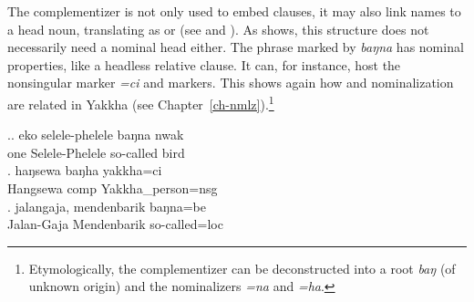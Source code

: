 The complementizer is not only used to embed clauses, it may also link names to a head noun, translating as  or  (see \Next[a] and \Next[b]). As  \Next[c] shows, this structure does not necessarily need a nominal head either. The phrase marked by \emph{baŋna} has nominal properties, like a headless relative clause. It can, for instance, host the nonsingular marker \emph{=ci} and  markers. This shows again how  and nominalization are related in Yakkha (see Chapter~\ref{ch-nmlz}).\footnote{Etymologically, the complementizer can be deconstructed into a root \emph{baŋ} (of unknown origin) and the nominalizers \emph{=na} and \emph{=ha}.}
\largerpage

\ex.\ag. eko selele-phelele baŋna nwak\\
one Selele-Phelele so-called bird\\
 
\bg. haŋsewa       baŋha         yakkha=ci\\
Hangsewa {\sc comp} Yakkha\_person{\sc =nsg}\\
 
\bg.   jalangaja, mendenbarik baŋna=be   \\
Jalan-Gaja Mendenbarik so-called{\sc =loc}\\
  


 	